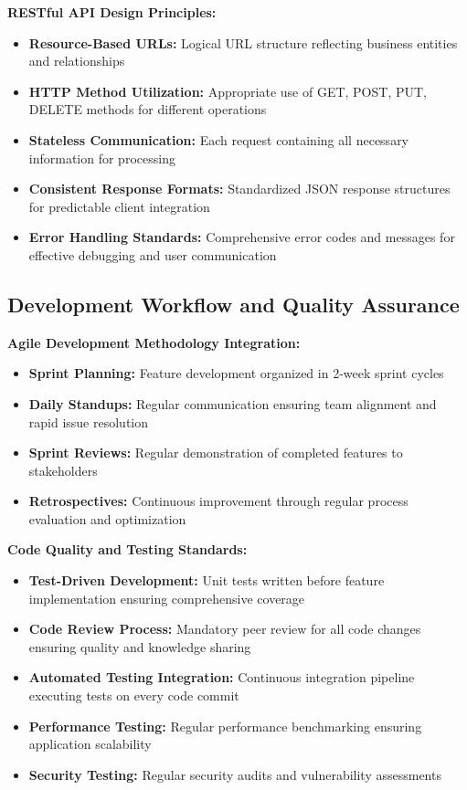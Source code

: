\textbf{RESTful API Design Principles:}
\begin{itemize}
    \item \textbf{Resource-Based URLs:} Logical URL structure reflecting business entities and relationships
    \item \textbf{HTTP Method Utilization:} Appropriate use of GET, POST, PUT, DELETE methods for different operations
    \item \textbf{Stateless Communication:} Each request containing all necessary information for processing
    \item \textbf{Consistent Response Formats:} Standardized JSON response structures for predictable client integration
    \item \textbf{Error Handling Standards:} Comprehensive error codes and messages for effective debugging and user communication
\end{itemize}

\subsection{Development Workflow and Quality Assurance}

\textbf{Agile Development Methodology Integration:}
\begin{itemize}
    \item \textbf{Sprint Planning:} Feature development organized in 2-week sprint cycles
    \item \textbf{Daily Standups:} Regular communication ensuring team alignment and rapid issue resolution
    \item \textbf{Sprint Reviews:} Regular demonstration of completed features to stakeholders
    \item \textbf{Retrospectives:} Continuous improvement through regular process evaluation and optimization
\end{itemize}

\textbf{Code Quality and Testing Standards:}
\begin{itemize}
    \item \textbf{Test-Driven Development:} Unit tests written before feature implementation ensuring comprehensive coverage
    \item \textbf{Code Review Process:} Mandatory peer review for all code changes ensuring quality and knowledge sharing
    \item \textbf{Automated Testing Integration:} Continuous integration pipeline executing tests on every code commit
    \item \textbf{Performance Testing:} Regular performance benchmarking ensuring application scalability
    \item \textbf{Security Testing:} Regular security audits and vulnerability assessments
\end{itemize}

